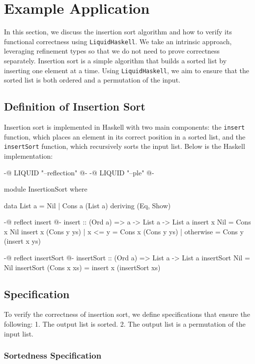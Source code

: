 \documentclass[]{rptuseminar}
\begin{document}
\section{Example Application}
\label{sec:example}

In this section, we discuss the insertion sort algorithm and how to verify its functional correctness using \texttt{LiquidHaskell}.  
We take an intrinsic approach, leveraging refinement types so that we do not need to prove correctness separately.  
Insertion sort is a simple algorithm that builds a sorted list by inserting one element at a time.  
Using \texttt{LiquidHaskell}, we aim to ensure that the sorted list is both ordered and a permutation of the input.  

\subsection{Definition of Insertion Sort}

Insertion sort is implemented in Haskell with two main components: 
the \texttt{insert} function, which places an element in its correct position in a sorted list, 
and the \texttt{insertSort} function, which recursively sorts the input list. Below is the Haskell implementation:

\begin{haskell}
{-@ LIQUID "--reflection" @-}
{-@ LIQUID "--ple" @-}

module InsertionSort where

data List a = Nil | Cons a (List a) deriving (Eq, Show)

{-@ reflect insert @-}
insert :: (Ord a) => a -> List a -> List a
insert x Nil = Cons x Nil
insert x (Cons y ys)
  | x <= y    = Cons x (Cons y ys)
  | otherwise = Cons y (insert x ys)

{-@ reflect insertSort @-}
insertSort :: (Ord a) => List a -> List a
insertSort Nil = Nil
insertSort (Cons x xs) = insert x (insertSort xs)
\end{haskell}

\subsection{Specification}

To verify the correctness of insertion sort, we define specifications that ensure the following:
1. The output list is sorted.
2. The output list is a permutation of the input list.

\subsubsection{Sortedness Specification}
\end{document}
